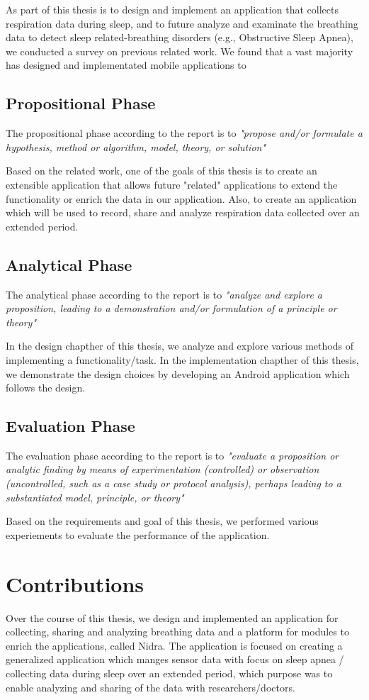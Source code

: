 As part of this thesis is to design and implement an application that collects respiration data during sleep, and to future analyze and examinate the breathing data to detect sleep related-breathing disorders (e.g., Obstructive Sleep Apnea), we conducted a survey on previous related work. We found that a vast majority has designed and implementated mobile applications to 

\subsection{Propositional Phase}
The propositional phase according to the report is to \textit{"propose and/or formulate a hypothesis, method or algorithm, model, theory, or solution"}

Based on the related work, one of the goals of this thesis is to create an extensible application that allows future "related" applications to extend the functionality or enrich the data in our application. Also, to create an application which will be used to record, share and analyze respiration data collected over an extended period. 

\subsection{Analytical Phase}
The analytical phase according to the report is to \textit{"analyze and explore a proposition, leading to a demonstration and/or formulation of a principle or theory"}

In the design chapther of this thesis, we analyze and explore various methods of implementing a functionality/task. In the implementation chapther of this thesis, we demonstrate the design choices by developing an Android application which follows the design. 

\subsection{Evaluation Phase}
The evaluation phase according to the report is to \textit{"evaluate a proposition or analytic finding by means of experimentation (controlled) or observation (uncontrolled, such as a case study or protocol analysis), perhaps leading to a substantiated model, principle, or theory"}

Based on the requirements and goal of this thesis, we performed various experiements to evaluate the performance of the application.

\section{Contributions}
Over the course of this thesis, we design and implemented an application for collecting, sharing and analyzing breathing data and a platform for modules to enrich the applications, called Nidra. The application is focused on creating a generalized application which manges sensor data with focus on sleep apnea / collecting data during sleep over an extended period, which purpose was to enable analyzing and sharing of the data with researchers/doctors.  

